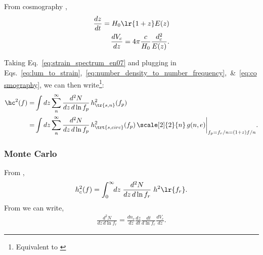 \documentclass[10pt, oneside, onecolumn]{article}   	%
\newcommand{\hsn}{h_\tr{s,n}}
\newcommand{\hscirc}{h_\trt{s,circ}}
\begin{document}
                From cosmography \citep[e.g.][]{Hogg1999},
                \begin{subequations}
                \begin{align}
                    \label{eq:cosmography}
                    \frac{dz}{dt} = H_0 \lr{1+z} E(z) \\
                    \frac{d V_c}{dz} = 4\pi \frac{c}{H_0} \frac{d_c^2}{E(z)}.
                \end{align}
                \end{subequations}

                Taking Eq.~\ref{eq:strain_spectrum_en07} and plugging in Eqs.~\ref{eq:lum_to_strain},~\ref{eq:number_density_to_number_frequency},~\&~\ref{eq:cosmography}, we can then write\footnote{Equivalent to \citet[][Eq.~10]{sesana2008}}:
                \begin{subequations}
                \begin{align}
                    \hc^2(f) = & \int dz \sum_n^\infty \frac{d^2 N}{dz \, d\ln f_p} \, \hsn^2(f_p) \\
                        = & \int dz \sum_n^\infty \frac{d^2 N}{dz \, d\ln f_p} \, \hscirc^2(f_p) \, \scale[2]{2}{n} \, g(n,e) \bigg|_{f_p = f_r / n = (1+z) f / n}.
                \end{align}
                \end{subequations}

        \subsubsection{Monte Carlo}

            From \citet[][Eq.~10]{sesana2008},
            \begin{align}
                h_c^2(f) = \int_0^\infty \!\! dz \; \frac{d^2 N}{dz \, d\ln f_r} \; h^2\lr{f_r}.
            \end{align}
            From \citet[][Eq.~6]{sesana2008} we can write,
            \begin{align}
                \frac{d^2 N}{dz \, d\ln f_r} = \frac{d n_c}{dz} \frac{dz}{dt} \frac{dt}{d\ln f_r} \frac{d V_c}{dz}.
            \end{align}
\end{document}
